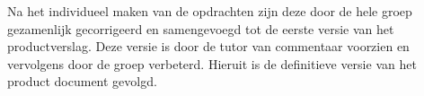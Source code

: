 
Na het individueel maken van de opdrachten zijn deze door de hele groep gezamenlijk gecorrigeerd en samengevoegd tot de eerste
versie van het productverslag. Deze versie is door de tutor van commentaar voorzien en vervolgens door de groep verbeterd.
Hieruit is de definitieve versie van het product document gevolgd.
